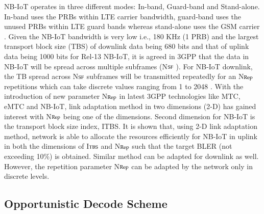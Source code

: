 \begin{multicols}{2}
NB-IoT operates in three different modes: In-band, Guard-band and Stand-alone. In-band uses the PRBs within LTE carrier bandwidth, guard-band uses the unused PRBs within LTE guard bands whereas stand-alone uses the GSM carrier \cite{art1-key25}. Given the NB-IoT bandwidth is very low i.e., 180 KHz (1 PRB) and the largest transport block size (TBS) of downlink data being 680 bits and that of uplink data being 1000 bits \cite{art1-key06} for Rel-13 NB-IoT, it is agreed in 3GPP that the data in NB-IoT will be spread across multiple subframes (N$\scriptsize{\text{SF}}$ ). For NB-IoT downlink, the TB spread across N$\scriptsize{\text{SF}}$ subframes will be transmitted repeatedly for an N$\scriptsize{\text{Rep}}$ repetitions which can take discrete values ranging from 1 to 2048 \cite{art1-key27}. With the introduction of new parameter N$\scriptsize{\text{Rep}}$ in latest 3GPP technologies like MTC, eMTC and NB-IoT, link adaptation method in two dimensions (2-D) has gained interest with N$\scriptsize{\text{Rep}}$ being one of the dimensions. Second dimension for NB-IoT is the transport block size index, ITBS. It is shown that, using 2-D link adaptation method, network is able to allocate the resources efficiently for NB-IoT in uplink in both the dimensions of I$\scriptsize{\text{TBS}}$ and N$\scriptsize{\text{Rep}}$ such that the target BLER (not exceeding 10$\%$) is obtained. Similar method can be adapted for downlink as well. However, the repetition parameter N$\scriptsize{\text{Rep}}$ can be adapted by the network only in discrete levels. 

\subsection{Opportunistic Decode Scheme}


\end{multicols}
